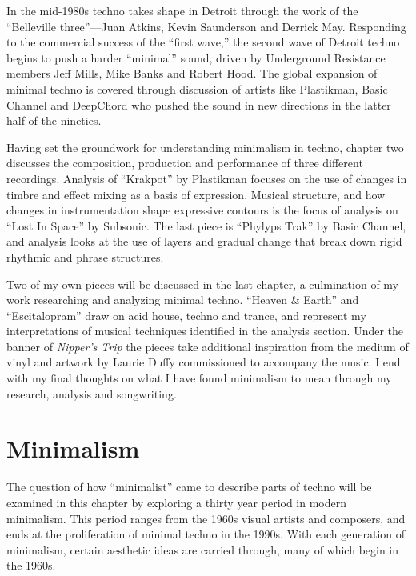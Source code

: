 \documentclass[12pt,twoside]{reedthesis}
\begin{document}
In the mid-1980s techno takes shape in Detroit through the work of the ``Belleville three''---Juan Atkins, Kevin Saunderson and Derrick May. Responding to the commercial success of the ``first wave,'' the second wave of Detroit techno begins to push a harder ``minimal'' sound, driven by Underground Resistance members Jeff Mills, Mike Banks and Robert Hood. The global expansion of minimal techno is covered through discussion of artists like Plastikman, Basic Channel and DeepChord who pushed the sound in new directions in the latter half of the nineties.

Having set the groundwork for understanding minimalism in techno, chapter two discusses the composition, production and performance of three different recordings. Analysis of ``Krakpot'' by Plastikman focuses on the use of changes in timbre and effect mixing as a basis of expression. Musical structure, and how changes in instrumentation shape expressive contours is the focus of analysis on ``Lost In Space'' by Subsonic. The last piece is ``Phylyps Trak'' by Basic Channel, and analysis looks at the use of layers and gradual change that break down rigid rhythmic and phrase structures.

Two of my own pieces will be discussed in the last chapter, a culmination of my work researching and analyzing minimal techno. ``Heaven {\&} Earth'' and ``Escitalopram'' draw on acid house, techno and trance, and represent my interpretations of musical techniques identified in the analysis section. Under the banner of \emph{Nipper's Trip} the pieces take additional inspiration from the medium of vinyl and artwork by Laurie Duffy commissioned to accompany the music. I end with my final thoughts on what I have found minimalism to mean through my research, analysis and songwriting.




    \chapter{Minimalism}

The question of how ``minimalist'' came to describe parts of techno will be examined in this chapter by exploring a thirty year period in modern minimalism. This period ranges from the 1960s visual artists and composers, and ends at the proliferation of minimal techno in the 1990s. With each generation of minimalism, certain aesthetic ideas are carried through, many of which begin in the 1960s.
\end{document}
